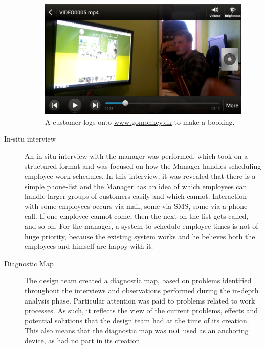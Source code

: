 \begin{description}
        \begin{figure}
            \includegraphics[width=\textwidth]{figures/cust_observe}
            \caption{A customer logs onto \url{www.gomonkey.dk} to make a
            booking. \label{fig:cust_obs}}
        \end{figure}
    \item [In-situ interview] An in-situ interview with the manager was
        performed, which took on a structured format and was focused on how the
        Manager handles scheduling employee work schedules. In this interview,
        it was revealed that there is a simple phone-list and the Manager has an
        idea of which employees can handle larger groups of customers easily and
        which cannot. Interaction with some employees occurs via mail, some via
        SMS, some via a phone call. If one employee cannot come, then the next
        on the list gets called, and so on. For the manager, a system to
        schedule employee times is not of huge priority, because the existing
        system works and he believes both the employees and himself are happy
        with it.
    \item [Diagnostic Map] The design team created a diagnostic map, based on
        problems identified throughout the interviews and observations performed 
        during the in-depth analysis phase. Particular attention was paid to
        problems related to work processes. As such, it reflects the view of the
        current problems, effects and potential solutions that the design team
        had at the time of its creation. This also means that the diagnostic map
        was \textbf{not} used as an anchoring device\cite{bodker2004participatory}, 
        as \gomonkey{} had no part in its creation. 
\end{description}

